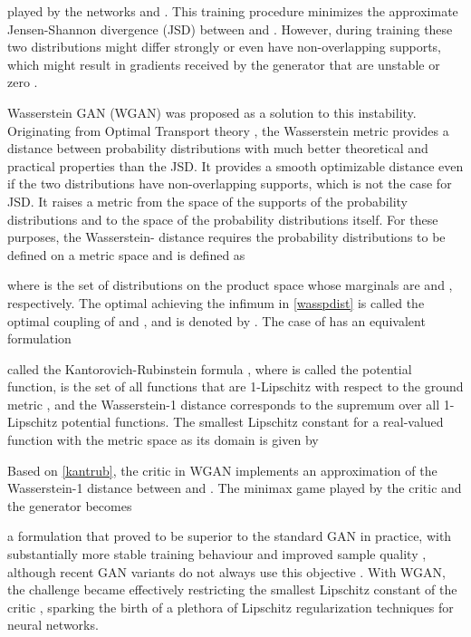 \documentclass{article}
\begin{document}
played by the networks  and . This training procedure minimizes the approximate Jensen-Shannon divergence (JSD) between  and  \citep{Goodfellowetal2014a}. However, during training these two distributions might differ strongly or even have non-overlapping supports, which might result in gradients received by the generator that are unstable or zero \citep{Arjovskyetal2017b}.

Wasserstein GAN (WGAN) \citep{Arjovskyetal2017} was proposed as a solution to this instability. Originating from Optimal Transport theory \citep{Villani2008}, the Wasserstein metric provides a distance between probability distributions with much better theoretical and practical properties than the JSD. It provides a smooth optimizable distance even if the two distributions have non-overlapping supports, which is not the case for JSD. It raises a metric  from the space  of the supports of the probability distributions  and  to the space of the probability distributions itself. For these purposes, the Wasserstein- distance requires the probability distributions to be defined on a metric space and is defined as

where  is the set of distributions on the product space  whose marginals are  and , respectively. The optimal  achieving the infimum in \eqref{wasspdist} is called the optimal coupling of  and , and is denoted by . The case of  has an equivalent formulation

called the Kantorovich-Rubinstein formula \citep{Villani2008}, where  is called the potential function,  is the set of all functions that are 1-Lipschitz with respect to the ground metric , and the Wasserstein-1 distance corresponds to the supremum over all 1-Lipschitz potential functions. The smallest Lipschitz constant for a real-valued function  with the metric space  as its domain is given by

Based on \eqref{kantrub}, the critic in WGAN \citep{Arjovskyetal2017} implements an approximation of the Wasserstein-1 distance between  and . The minimax game played by the critic  and the generator  becomes

a formulation that proved to be superior to the standard GAN in practice, with substantially more stable training behaviour and improved sample quality \citep{Arjovskyetal2017}, although recent GAN variants do not always use this objective \citep{Brocketal2018}. With WGAN, the challenge became effectively restricting the smallest Lipschitz constant of the critic , sparking the birth of a plethora of Lipschitz regularization techniques for neural networks.
\end{document}
